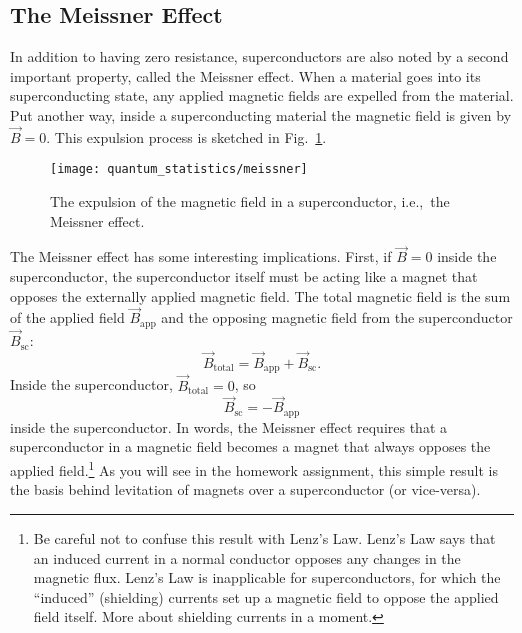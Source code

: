 %
\subsection{The Meissner Effect}

In addition to having zero resistance, superconductors are also noted
by a second important property, called the Meissner effect.  When a
material goes into its superconducting state, any applied magnetic
fields are expelled from the material.  Put another way, inside a
superconducting material the magnetic field is given by $\vec B=0$.
This expulsion process is sketched in Fig.~\ref{fig:meissner}.

\begin{figure}[tbp]
\begin{center}
\texttt{[image: quantum\_statistics/meissner]}
\caption{The expulsion of the magnetic field in a superconductor, i.e.,\
the Meissner effect.}
\label{fig:meissner}
\end{center}
\end{figure}

The Meissner effect has some interesting implications.  First, if
$\vec B= 0$ inside the superconductor, the superconductor itself must
be acting like a magnet that opposes the externally applied magnetic
field.  The total magnetic field is the sum of the applied field
$\vec B_\text{app}$ and the opposing magnetic field from the
superconductor $\vec B_\text{sc}$:
\begin{equation}
\vec B_\text{total} = \vec B_\text{app} + \vec B_\text{sc}.
\end{equation}
Inside the superconductor, $\vec B_\text{total} = 0$, so
\begin{equation}
\vec B_\text{sc} = -\vec B_\text{app}
\end{equation}
inside the superconductor.  In words, the Meissner effect requires
that a superconductor in a magnetic field becomes a magnet that always
opposes the applied field.\footnote{Be careful not to confuse this
result with Lenz's Law.  Lenz's Law says that an induced current in a
normal conductor opposes any changes in the magnetic flux.  Lenz's Law
is inapplicable for superconductors, for which the ``induced''
(shielding) currents set up a magnetic field to oppose the applied
field itself.  More about shielding currents in a moment.} As you
will see in the homework assignment, this simple result is the basis
behind levitation of magnets over a superconductor (or vice-versa).

